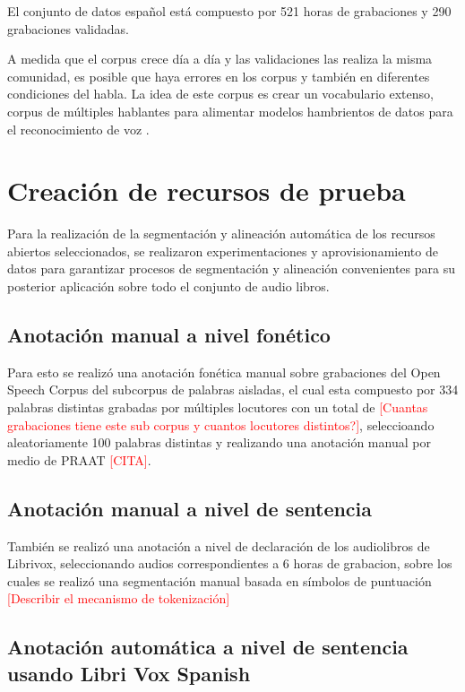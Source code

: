 \documentclass[a4paper,12pt,twoside]{report}
\begin{document}
El conjunto de datos español está compuesto por 521 horas de grabaciones y 290 grabaciones validadas.

A medida que el corpus crece día a día y las validaciones las realiza la misma comunidad, es posible que haya errores en los corpus y también en diferentes condiciones del habla. La idea de este corpus es crear un vocabulario extenso, corpus de múltiples hablantes para alimentar modelos hambrientos de datos para el reconocimiento de voz \cite{Common-Voice}.

\chapter{Creación de recursos de prueba}

Para la realización de la segmentación y alineación automática de los recursos abiertos seleccionados, se realizaron experimentaciones y aprovisionamiento de datos para garantizar procesos de segmentación y alineación convenientes para su posterior aplicación sobre todo el conjunto de audio libros.

\section{Anotación manual a nivel fonético}

Para esto se realizó una anotación fonética manual sobre grabaciones del Open Speech Corpus \cite{Collazos2015} del subcorpus de palabras aisladas, el cual esta compuesto por 334 palabras distintas grabadas por múltiples locutores con un total de \textcolor{red}{[Cuantas grabaciones tiene este sub corpus y cuantos locutores distintos?]}, seleccioando aleatoriamente 100 palabras distintas y realizando una anotación manual por medio de PRAAT \textcolor{red}{[CITA]}.

\section{Anotación manual a nivel de sentencia}

También se realizó una anotación a nivel de declaración de los audiolibros de Librivox, seleccionando audios correspondientes a 6 horas de grabacion, sobre los cuales se realizó una segmentación manual basada en símbolos de puntuación \textcolor{red}{[Describir el mecanismo de tokenización]}

\section{Anotación automática a nivel de sentencia usando Libri Vox Spanish}
\end{document}
